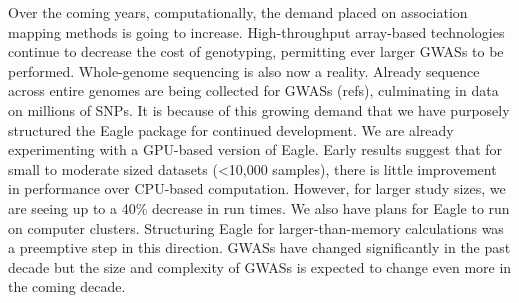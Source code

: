 \documentclass{article}
\begin{document}
Over the coming years, computationally, the demand placed on association mapping methods is going to increase. 
High-throughput array-based technologies continue to decrease the cost of genotyping, permitting ever larger GWASs to be performed. 
Whole-genome sequencing is also now a reality. Already sequence across entire genomes are being collected for GWASs (refs), 
culminating in data on millions of SNPs. It is because of this growing demand that 
we have purposely structured the Eagle package for continued development. We are already experimenting with a GPU-based version of Eagle. 
Early results suggest that for small to moderate sized datasets (<10,000 samples), there is little improvement in performance over CPU-based 
computation.  However, for larger study sizes, we are seeing up to a 40\% decrease in run times.  
We also have plans for Eagle to run on computer clusters. Structuring Eagle for larger-than-memory calculations was a 
preemptive step in this direction. GWASs have changed significantly in the past decade but the size and complexity of GWASs is expected 
to change even more in the coming decade. 























\end{document}
